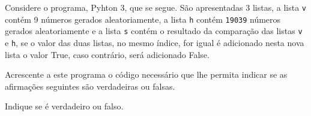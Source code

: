 \documentclass[12pt,varwidth=16cm,border=1pt]{standalone}
\begin{document}
Considere o programa, Pyhton 3, que se segue. São apresentadas 3 listas, a lista \verb+v+ contém 9 números gerados aleatoriamente, a lista \verb+h+ contém \verb+19039+ números gerados aleatoriamente e a lista \verb+s+ contém o resultado da comparação das listas \verb+v+ e \verb+h+, se o valor das duas listas, no mesmo índice, for igual é adicionado nesta nova lista o valor True, caso contrário, será adicionado False.


Acrescente a este programa o código necessário que lhe permita indicar se as
afirmações seguintes são verdadeiras ou falsas.

Indique se é verdadeiro ou falso.
\end{document}
